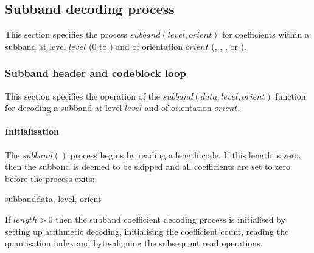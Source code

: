 \subsection{Subband decoding process}

\label{subbanddecodeprocess}

This section specifies the process $subband(level,orient)$ for coefficients
within a subband at level $level$ ($0$ to \TransformDepth) and of orientation $orient$
(\LL, \LH, \HL, or \HH). 

\subsubsection{Subband header and codeblock loop}

This section specifies the operation of the $subband(data, level, orient)$
function for decoding a subband at level $level$ and of orientation $orient$.

\paragraph{Initialisation\newline}

The $subband()$ process begins by reading a length code. If this length is
zero, then the subband is deemed to be skipped and all coefficients are set to zero
before the process exits:

\begin{pseudo}{subband}{data, level, orient}
    \bsEND
  \bsEND
  \bsRET{}
\bsEND
\bsCODE{\hdots}
\end{pseudo}

If $length>0$ then the subband coefficient decoding process is initialised by
setting up arithmetic decoding, initialising the coefficient count, reading
the quantisation index and byte-aligning the subsequent read operations.

\begin{pseudo*}
\bsEND
{}
\bsCODE{\hdots}
\end{pseudo*}

